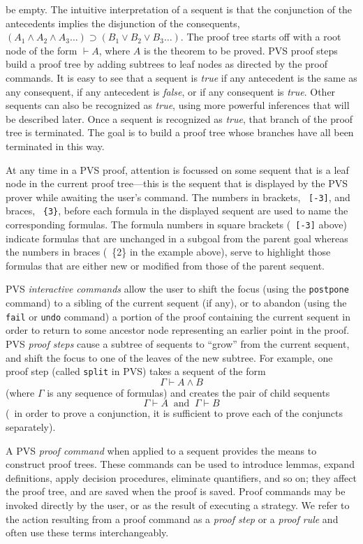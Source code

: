 \documentclass[12pt,twoside]{book}
\makeatletter
\newcommand{\indtt}[1]{\texttt{#1}\index{#1@{\texttt{#1}}}}  %
\makeatother
\begin{document}
be empty.  The intuitive interpretation of a sequent is that the
conjunction of the antecedents  implies the disjunction of the
consequents, \ie\ $(A_1\wedge A_2\wedge A_3 \ldots) \supset (B_1 \vee
B_2 \vee B_3 \ldots)$.  The proof tree starts off with a root node of
the form $ \vdash A$, where $A$ is the theorem to be proved.   PVS
proof steps build a proof tree by adding subtrees to leaf nodes
as directed by the proof commands. 
It is easy to see that a sequent is \emph{true} if any antecedent is the same as any consequent, if any
antecedent is \emph{false}, or if any consequent is \emph{true}.
Other sequents can also be recognized as \emph{true}, using more
powerful inferences that will be described later.
Once a sequent is recognized as \emph{true}, that branch of the
proof tree is terminated.   The goal is to build a proof tree whose
branches have all been terminated in this way.

At any time in a PVS proof, attention is focussed on some sequent that is
a leaf node in the current proof tree---this is the sequent that is
displayed by the PVS prover while awaiting the user's command.  The
numbers in brackets, \eg\ \texttt{[-3]}, and braces, \eg\ \texttt{\{3\}},
before each formula in the displayed sequent are used to name the
corresponding formulas.  The formula numbers in square brackets (\eg\
\texttt{[-3]} above) indicate formulas that are unchanged in a subgoal
from the parent goal whereas the numbers in braces (\eg\ \{2\} in the
example above), serve to highlight those formulas that are either new or
modified from those of the parent sequent.

PVS \emph{interactive commands} allow the user to shift the focus (using
the \indtt{postpone} command) to a sibling of the current sequent (if any), or
to abandon (using the \indtt{fail} or \indtt{undo} command) a portion of the proof
containing the current sequent in order to return to some ancestor node
representing an earlier point in the proof.  PVS \emph{proof steps} cause a
subtree of sequents to ``grow'' from the current sequent, and shift the focus
to one of the leaves of the new subtree.  For example, one proof step (called
\indtt{split} in PVS) takes a sequent of the form \[ \Gamma \vdash A \wedge B
\] (where $\Gamma$ is any sequence of formulas) and creates the pair of child
sequents \[ \Gamma \vdash A \ \mbox{\ and\ }\ \Gamma \vdash B\] (\ie\ in order
to prove a conjunction, it is sufficient to prove each of the conjuncts
separately).

A PVS \emph{proof command} when applied to a sequent provides the
means to construct proof trees.  These commands can be used to introduce
lemmas, expand definitions, apply decision procedures, eliminate
quantifiers, and so on; they affect the proof tree, and are saved when
the proof is saved.  Proof commands may be invoked directly by the user,
or as the result of executing a strategy.   We refer to the
action resulting from a proof command as a \emph{proof step} or a \emph{proof
rule} and often use  these terms interchangeably.  
\end{document}

